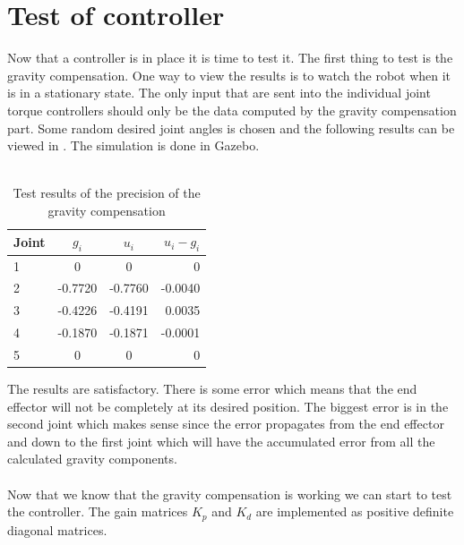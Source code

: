 \section{Test of controller}
Now that a controller is in place it is time to test it. The first thing to test is the gravity compensation. One way to view the results is to watch the robot when it is in a stationary state. The only input that are sent into the individual joint torque controllers should only be the data computed by the gravity compensation part. Some random desired joint angles is chosen and the following results can be viewed in . The simulation is done in Gazebo.\\\\
\begin{table}[htbp]
\centering
\caption{Test results of the precision of the gravity compensation}
\label{table:gravity}
    \begin{tabular}{l c c r}
        \toprule
        Joint  &  $g_i$ & $u_i$ & $u_i-g_i$\\
        \midrule
        1 & 0 & 0 & 0\\
        2 & -0.7720  & -0.7760  & -0.0040 \\
        3 &-0.4226 & -0.4191 & 0.0035 \\
        4 & -0.1870 &-0.1871 & -0.0001\\
        5 & 0 & 0 & 0\\
        \bottomrule
    \end{tabular}
\end{table}
The results are satisfactory. There is some error which means that the end effector will not be completely at its desired position. The biggest error is in the second joint which makes sense since the error propagates from the end effector and down to the first joint which will have the accumulated error from all the calculated gravity components.\\\\
Now that we know that the gravity compensation is working we can start to test the controller. The gain matrices $K_p$ and $K_d$ are implemented as positive definite diagonal matrices.\\\\
\def\picsSiz{1.08}
